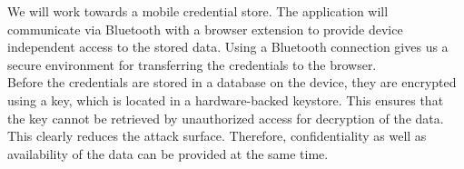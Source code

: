 \documentclass[a1paper,usenames,dvipsnames]{tikzposter} %
\begin{document}
{We will work towards a mobile credential store. The application will communicate via Bluetooth with a browser extension to provide device independent access to the stored data. Using a Bluetooth connection gives us a secure environment for transferring the credentials to the browser. \\
Before the credentials are stored in a database on the device, they are encrypted using a key, which is located in a hardware-backed keystore. This ensures that the key cannot be retrieved by unauthorized access for decryption of the data. This clearly reduces the attack surface. Therefore, confidentiality as well as availability of the data can be provided at the same time.}
\end{document}

